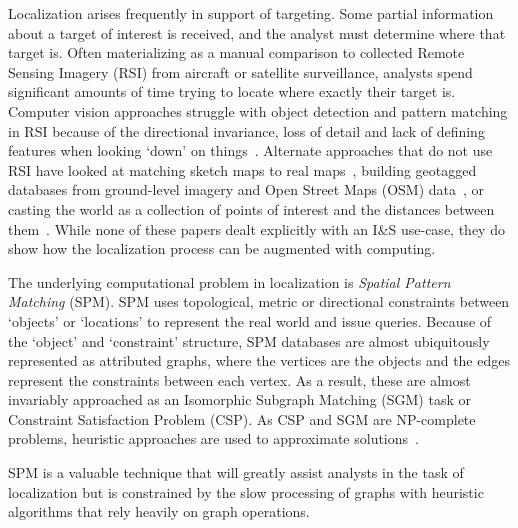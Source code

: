 Localization arises frequently in support of targeting.
Some partial information about a target of interest is received, and the analyst must determine where that target is. 
Often materializing as a manual comparison to collected Remote Sensing Imagery (RSI) from aircraft or satellite surveillance, analysts spend significant amounts of time trying to locate where exactly their target is. 
Computer vision approaches struggle with object detection and pattern matching in RSI because of the directional invariance, loss of detail and lack of defining features when looking `down' on things~\cite{Ding2021, Lam2018, Li2020, Xia2018}.
Alternate approaches that do not use RSI have looked at matching sketch maps to real maps~\cite{Schwering2014}, building geotagged databases from ground-level imagery and Open Street Maps (OSM) data~\cite{Osullivan2023a}, or casting the world as a collection of points of interest and the distances between them~\cite{Fang2018}.
While none of these papers dealt explicitly with an I\&S use-case, they do show how the localization process can be augmented with computing.  

The underlying computational problem in localization is \textit{Spatial Pattern Matching} (SPM).
SPM uses topological, metric or directional constraints between `objects' or `locations' to represent the real world and issue queries. 
Because of the `object' and `constraint' structure, SPM databases are almost ubiquitously represented as attributed graphs, where the vertices are the objects and the edges represent the constraints between each vertex. 
As a result, these are almost invariably approached as an Isomorphic Subgraph Matching (SGM) task or Constraint Satisfaction Problem (CSP). 
As CSP and SGM are NP-complete problems, heuristic approaches are used to approximate solutions~\cite{Osullivan2023}. 

SPM is a valuable technique that will greatly assist analysts in the task of localization but is constrained by the slow processing of graphs with heuristic algorithms that rely heavily on graph operations. 

